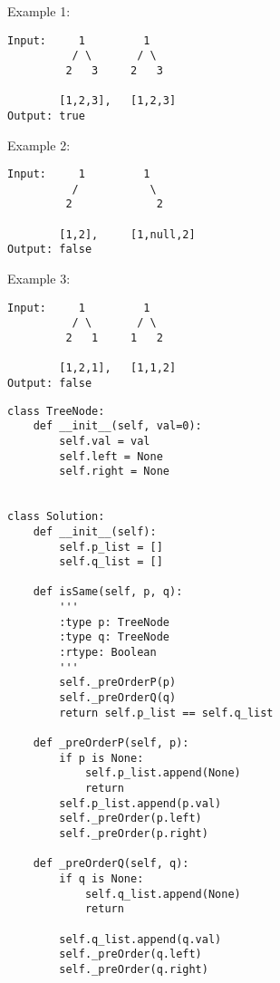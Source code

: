 \documentclass[11pt]{article}
\begin{document}
Example 1:
\begin{verbatim}
Input:     1         1
          / \       / \
         2   3     2   3

        [1,2,3],   [1,2,3]
Output: true
\end{verbatim}
Example 2:
\begin{verbatim}
Input:     1         1
          /           \
         2             2

        [1,2],     [1,null,2]
Output: false
\end{verbatim}

Example 3:
\begin{verbatim}
Input:     1         1
          / \       / \
         2   1     1   2

        [1,2,1],   [1,1,2]
Output: false
\end{verbatim}
\begin{verbatim}
class TreeNode:
    def __init__(self, val=0):
        self.val = val
        self.left = None
        self.right = None


class Solution:
    def __init__(self):
        self.p_list = []
        self.q_list = []

    def isSame(self, p, q):
        '''
        :type p: TreeNode
        :type q: TreeNode
        :rtype: Boolean
        '''
        self._preOrderP(p)
        self._preOrderQ(q)
        return self.p_list == self.q_list

    def _preOrderP(self, p):
        if p is None:
            self.p_list.append(None)
            return
        self.p_list.append(p.val)
        self._preOrder(p.left)
        self._preOrder(p.right)

    def _preOrderQ(self, q):
        if q is None:
            self.q_list.append(None)
            return

        self.q_list.append(q.val)
        self._preOrder(q.left)
        self._preOrder(q.right)


\end{verbatim}
\end{document}
